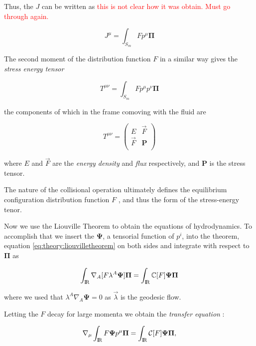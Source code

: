Thus, the $J$ can be written as 
\textcolor{red}{this is not clear how it was obtain. Must go through again.}

\begin{equation}
J^{\mu} = \int_{S_m}Fp^{\mu}\boldsymbol{\Pi}
\end{equation}

The second moment of the distribution function $F$ in a similar way gives the \textit{stress energy tensor} 

\begin{equation}
T^{\mu\nu} = \int_{S_m} F p^{\mu}p^{\nu}\boldsymbol{\Pi}
\end{equation}

the components of which in the frame comoving with the fluid are

\begin{equation}
T^{\mu\nu} = 
\begin{pmatrix}
E & \vec{F} \\
\vec{F} & \boldsymbol{P} \\
\end{pmatrix}
\end{equation}

where $E$ and $\vec{F}$ are the \textit{energy density} and \textit{flux} respectively, and $\boldsymbol{P}$ is the stress tensor. 

The nature of the collisional operation ultimately defines the equilibrium configuration distribution function $F$ \cite{Cercignani:2002}, and thus the form of the stress-energy tenor. 

Now we use the Liouville Theorem to obtain the equations of hydrodynamics. 
To accomplish that we insert the $\boldsymbol{\Psi}$, a tensorial function of $p^i$, into the theorem, equation \ref{eq:theory:liouvilletheorem} on both sides and integrate with respect to $\boldsymbol{\Pi}$ as

\begin{equation}
\int_{\text{I\!R}}\nabla_{A}[F\lambda^A\boldsymbol{\Psi}]\boldsymbol{\Pi}=\int_{\text{I\!R}}\mathbb{C}[F]\boldsymbol{\Psi}\boldsymbol{\Pi}
\end{equation}

where we used that $\lambda^A\nabla_{A}\boldsymbol{\Psi}=0$ as $\vec{\lambda}$ is the geodesic flow. 

Letting the $F$ decay for large momenta we obtain the \textit{transfer equation} \cite{Israel:1963,Cercignani:2002}:

\begin{equation}
\nabla_{\mu}\int_{\text{I\!R}} F\boldsymbol{\Psi}p^{\mu}\boldsymbol{\Pi} =\int_{\text{I\!R}} \mathcal{C}[F]\boldsymbol{\Psi}\boldsymbol{\Pi},
\label{eq:theory:transferequation}
\end{equation}

